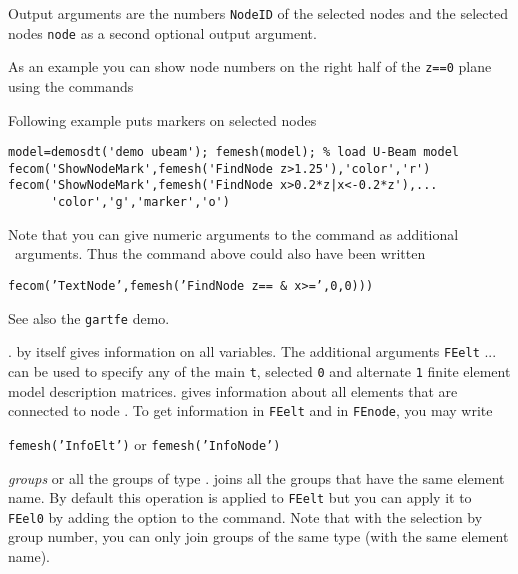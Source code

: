\noindent Output arguments are the numbers {\tt NodeID} of the selected nodes and the selected nodes {\tt node} as a second optional output argument. 

\noindent As an example you can show node numbers on the right half of the {\tt z==0} plane using the commands


Following example puts markers on selected nodes
\begin{verbatim}
model=demosdt('demo ubeam'); femesh(model); % load U-Beam model
fecom('ShowNodeMark',femesh('FindNode z>1.25'),'color','r')
fecom('ShowNodeMark',femesh('FindNode x>0.2*z|x<-0.2*z'),...
      'color','g','marker','o')
\end{verbatim}%


Note that you can give numeric arguments to the command as additional \femesh\ arguments. Thus the command above could also have been written 

{\tt fecom('TextNode',femesh('FindNode z== \& x>=',0,0)))}

 See also the {\tt gartfe} demo.



.   by itself gives information on all variables. The additional arguments {\tt FEelt} ...  can be used to specify any of the main {\tt t}, selected {\tt 0} and alternate {\tt 1} finite element model description matrices.  gives information about all elements that are connected to node . To get information in {\tt FEelt} and in {\tt FEnode}, you may write

{\tt femesh('InfoElt')} or {\tt femesh('InfoNode')}
 

 {\sl groups}  or all the groups of type .  joins all the groups that have the same element name. By default this operation is applied to {\tt FEelt} but you can apply it to {\tt FEel0} by adding the  option to the command. Note that with the selection by group number, you can only join groups of the same type (with the same element name).

